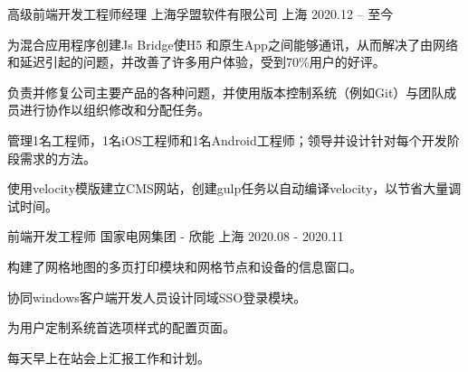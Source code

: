 
\begin{cventries}


  \cventry
    {高级前端开发工程师经理} %
    {上海孚盟软件有限公司} %
    {上海} %
    {2020.12 -- 至今 } %
    {
      \begin{cvitems} %
        \item{为混合应用程序创建Js Bridge使H5 和原生App之间能够通讯，从而解决了由网络和延迟引起的问题，并改善了许多用户体验，受到70\%用户的好评。}
        \item{负责并修复公司主要产品的各种问题，并使用版本控制系统（例如Git）与团队成员进行协作以组织修改和分配任务。}
        \item{管理1名工程师，1名iOS工程师和1名Android工程师；领导并设计针对每个开发阶段需求的方法。}
        \item{使用velocity模版建立CMS网站，创建gulp任务以自动编译velocity，以节省大量调试时间。}
      \end{cvitems}
    }


  \cventry
    {前端开发工程师} %
    {国家电网集团 - 欣能 } %
    {上海} %
    {2020.08 - 2020.11} %
    {
      \begin{cvitems} %
        \item{构建了网格地图的多页打印模块和网格节点和设备的信息窗口。}
        \item{协同windows客户端开发人员设计同域SSO登录模块。}
        \item{为用户定制系统首选项样式的配置页面。}
        \item{每天早上在站会上汇报工作和计划。}
      \end{cvitems}
    }



\end{cventries}
